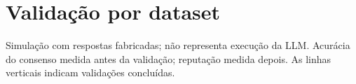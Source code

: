 \documentclass[11pt]{article}
\begin{document}
\section*{Validação por dataset}
Simulação com respostas fabricadas; não representa execução da LLM. Acurácia do consenso medida antes da validação; reputação medida depois. As linhas verticais indicam validações concluídas.





\end{document}
